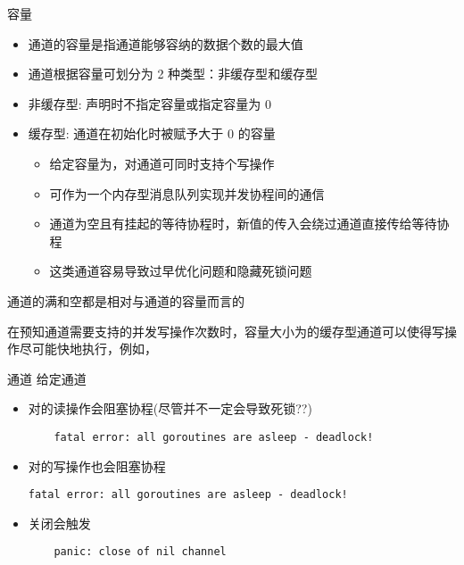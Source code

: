 \begin{frame}{容量}
    \begin{itemize}
        \item 通道的容量是指通道能够容纳的数据个数的最大值
        \item\pause 通道根据容量可划分为 2 种类型：\alert{非缓存型}和\alert{缓存型}
        \item 非缓存型: 声明时不指定容量或指定容量为 0
        \item 缓存型: 通道在初始化时被赋予大于 0 的容量
            \begin{itemize}
                \item 给定容量为，对通道可同时支持个写操作
                \item 可作为一个内存型消息队列实现并发协程间的通信
                \item 通道为空且有挂起的等待协程时，新值的传入会绕过通道直接传给等待协程
                \item 这类通道容易\alert{导致过早优化问题}和\alert{隐藏死锁问题}
            \end{itemize}
    \end{itemize}
    通道的\alert{满}和\alert{空}都是相对与通道的容量而言的 

    \pause\bigskip
    在预知通道需要支持的并发写操作次数时，容量大小为的缓存型通道可以使得写操作尽可能快地执行，例如，
\end{frame}

\begin{frame}[fragile]{通道}
    给定通道
    \begin{itemize}
        \item 对的读操作会阻塞协程(尽管并不一定会导致死锁??)
\begin{lstlisting}
    fatal error: all goroutines are asleep - deadlock!
\end{lstlisting}
        \item 对的写操作也会阻塞协程
\begin{lstlisting}
fatal error: all goroutines are asleep - deadlock!
\end{lstlisting}
        \item 关闭会触发
\begin{lstlisting}
    panic: close of nil channel 
\end{lstlisting}
    \end{itemize}
\end{frame}

